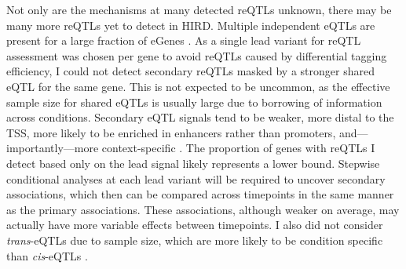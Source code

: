 Not only are the mechanisms at many detected \glspl{reQTL} unknown, there may be many more \glspl{reQTL} yet to detect in \gls{HIRD}.
Multiple independent \glspl{eQTL} are present for a large fraction of eGenes \autocite{zeng2019ComprehensiveMultipleEQTL}.
As a single lead variant for \gls{reQTL} assessment was chosen per gene
to avoid \glspl{reQTL} caused by differential tagging efficiency,
I could not detect secondary \glspl{reQTL} masked by a stronger shared \gls{eQTL} for the same gene.
This is not expected to be uncommon, as the effective sample size for shared \glspl{eQTL} is usually large due to borrowing of information across conditions.
Secondary \gls{eQTL} signals tend to be weaker, more distal to the \gls{TSS}, more likely to be enriched in enhancers rather than promoters, and---importantly---more context-specific \autocite{kim-hellmuth2017GeneticRegulatoryEffects,vandiedonck2017GeneticAssociationMolecular,dobbyn2018LandscapeConditionalEQTL,rotival2019CharacterisingGeneticBasis}.
The proportion of genes with \glspl{reQTL} I detect based only on the lead signal likely represents a lower bound.
Stepwise conditional analyses at each lead variant will be required to uncover secondary associations, 
which then can be compared across timepoints in the same manner as the primary associations.
These associations, although weaker on average, may actually have more variable effects between timepoints.
I also did not consider \textit{trans}-\glspl{eQTL} due to sample size, which are more likely to be condition specific than \textit{cis}-\glspl{eQTL} \autocite{fairfax2012GeneticsGeneExpression,westra2014GenomeFunctionStudying,fairfax2014InnateImmuneActivity}.

